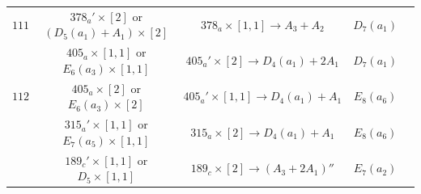 \documentclass[reqno,12pt]{amsart}
\numberwithin{equation}{section}
\theoremstyle{plain}
\theoremstyle{definition}
\newcommand{\lam}{\lambda}
\renewcommand{\subset}{\subseteq}
\begin{document}
\begin{table}[htbp]
\begin{tabular}{|c|c|c|c|c|}
$ 111$  
 &  $ 378_a'\times [2]$  or $(D_5(a_1)+A_1)\times [2]$&    $378_a\times [1,1] \rightarrow A_3+A_2$     &   $ D_7(a_1)$      \\
 &  $ 405_a\times [1,1]$  or $E_6(a_3)\times [1,1]$&     $405_a'\times [2] \rightarrow D_4(a_1)+2A_1$  &   $ D_7(a_1)$      \\
  \hline
$ 112$  
 &  $ 405_a\times [2]$  or $E_6(a_3)\times [2]$&     $405_a'\times [1,1] \rightarrow D_4(a_1)+A_1$  &   $ E_8(a_6)$      \\
&  $ 315_a'\times [1,1]$  or $E_7(a_5)\times [1,1]$&     $315_a\times [2] \rightarrow D_4(a_1)+A_1$  &   $ E_8(a_6)$      \\
 &  $ 189_c'\times [1,1]$  or $D_5\times [1,1]$&    $189_c\times [2] \rightarrow (A_3+2A_1)''$   &   $ E_7(a_2)$      \\
  \hline




	


\end{tabular}
\end{table}
\end{document}
